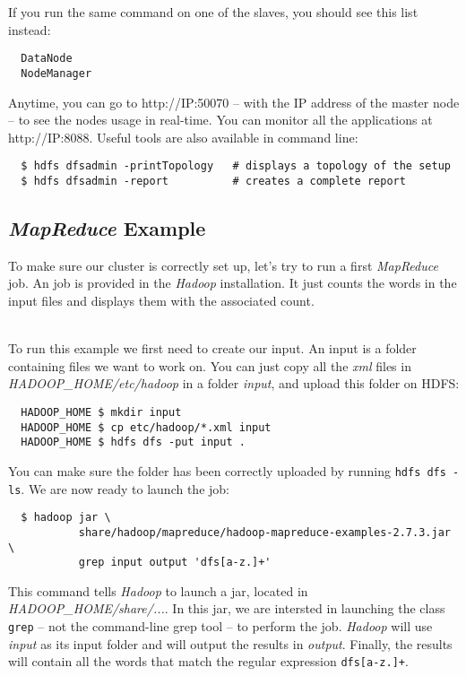 \documentclass[a4paper, 12pt]{article}
\begin{document}
If you run the same command on one of the slaves, you should see this list instead:
\begin{verbatim}
  DataNode
  NodeManager
\end{verbatim}

Anytime, you can go to http://IP:50070 -- with the IP address of the master node -- to see the nodes usage in real-time. You can monitor all the applications at http://IP:8088. Useful tools are also available in command line:

\begin{verbatim}
  $ hdfs dfsadmin -printTopology   # displays a topology of the setup
  $ hdfs dfsadmin -report          # creates a complete report
\end{verbatim}

  \subsection{\textit{MapReduce} Example}

To make sure our cluster is correctly set up, let's try to run a first \textit{MapReduce} job. An job is provided in the \textit{Hadoop} installation. It just counts the words in the input files and displays them with the associated count. 

~\\
To run this example we first need to create our input. An input is a folder containing files we want to work on. You can just copy all the \textit{xml} files in \textit{HADOOP\_HOME/etc/hadoop} in a folder \textit{input}, and upload this folder on HDFS:

\begin{verbatim}
  HADOOP_HOME $ mkdir input
  HADOOP_HOME $ cp etc/hadoop/*.xml input
  HADOOP_HOME $ hdfs dfs -put input .
\end{verbatim}

You can make sure the folder has been correctly uploaded by running \texttt{hdfs dfs -ls}. We are now ready to launch the job:

\begin{verbatim}
  $ hadoop jar \
           share/hadoop/mapreduce/hadoop-mapreduce-examples-2.7.3.jar \
           grep input output 'dfs[a-z.]+'
\end{verbatim}

This command tells \textit{Hadoop} to launch a jar, located in \textit{HADOOP\_HOME/share/...}. In this jar, we are intersted in launching the class \texttt{grep} -- not the command-line grep tool -- to perform the job. \textit{Hadoop} will use \textit{input} as its input folder and will output the results in \textit{output}. Finally, the results will contain all the words that match the regular expression \texttt{dfs[a-z.]+}.
\end{document}
